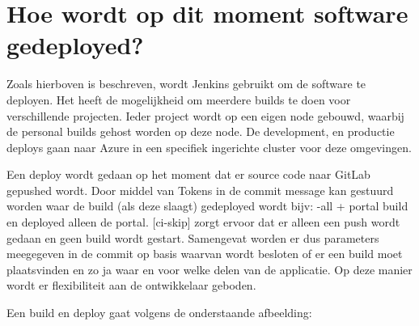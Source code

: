 \section{Hoe wordt op dit moment software gedeployed?} \label{sec:hoe-wordt-op-dit-moment-software-gedeployed?}
Zoals hierboven is beschreven, wordt Jenkins gebruikt om de software te deployen. Het heeft de mogelijkheid om meerdere builds te doen voor verschillende projecten. Ieder project wordt op een eigen node gebouwd, waarbij de personal builds gehost worden op deze node. De development, en productie deploys gaan naar Azure in een specifiek ingerichte cluster voor deze omgevingen.

Een deploy wordt gedaan op het moment dat er source code naar GitLab gepushed wordt. Door middel van Tokens in de commit message kan gestuurd worden waar de build (als deze slaagt) gedeployed wordt bijv: {-all + portal} build en deployed alleen de portal. [ci-skip] zorgt ervoor dat er alleen een push wordt gedaan en geen build wordt gestart.
Samengevat worden er dus parameters meegegeven in de commit op basis waarvan wordt besloten of er een build moet plaatsvinden en zo ja waar en voor welke delen van de applicatie. Op deze manier wordt er flexibiliteit aan de ontwikkelaar geboden.

Een build en deploy gaat volgens de onderstaande afbeelding:

